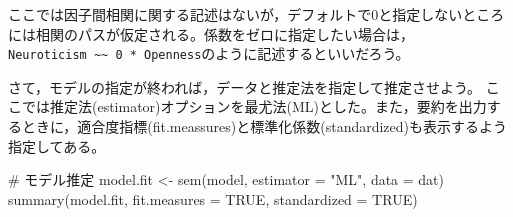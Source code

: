 \documentclass[
  a4paper,
]{ltjsbook}
\newenvironment{Shaded}{\begin{snugshade}}{\end{snugshade}}
\newcommand{\AttributeTok}[1]{\textcolor[rgb]{0.40,0.45,0.13}{#1}}
\newcommand{\CommentTok}[1]{\textcolor[rgb]{0.37,0.37,0.37}{#1}}
\newcommand{\ConstantTok}[1]{\textcolor[rgb]{0.56,0.35,0.01}{#1}}
\newcommand{\FunctionTok}[1]{\textcolor[rgb]{0.28,0.35,0.67}{#1}}
\newcommand{\NormalTok}[1]{\textcolor[rgb]{0.00,0.23,0.31}{#1}}
\newcommand{\OtherTok}[1]{\textcolor[rgb]{0.00,0.23,0.31}{#1}}
\newcommand{\StringTok}[1]{\textcolor[rgb]{0.13,0.47,0.30}{#1}}
\begin{document}
ここでは因子間相関に関する記述はないが，デフォルトで\(0\)と指定しないところには相関のパスが仮定される。係数をゼロに指定したい場合は，\texttt{Neuroticism\ \textasciitilde{}\textasciitilde{}\ 0\ *\ Openness}のように記述するといいだろう。

さて，モデルの指定が終われば，データと推定法を指定して推定させよう。
ここでは推定法(estimator)オプションを最尤法(ML)とした。また，要約を出力するときに，適合度指標(fit.meassures)と標準化係数(standardized)も表示するよう指定してある。

\begin{Shaded}
\begin{Highlighting}[]
\CommentTok{\# モデル推定}
\NormalTok{model.fit }\OtherTok{\textless{}{-}} \FunctionTok{sem}\NormalTok{(model, }\AttributeTok{estimator =} \StringTok{"ML"}\NormalTok{, }\AttributeTok{data =}\NormalTok{ dat)}
\FunctionTok{summary}\NormalTok{(model.fit, }\AttributeTok{fit.measures =} \ConstantTok{TRUE}\NormalTok{, }\AttributeTok{standardized =} \ConstantTok{TRUE}\NormalTok{)}
\end{Highlighting}
\end{Shaded}
\end{document}
